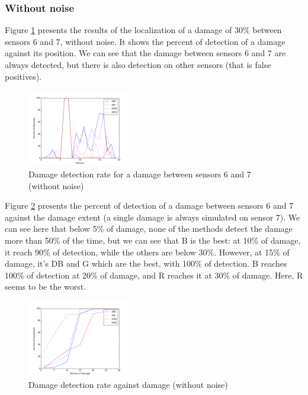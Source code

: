 \documentclass[journal]{IEEEtran}
\begin{document}
\subsubsection{Without noise}

Figure \ref{damage30} presents the results of the localization of a damage of 30\% between sensors 6 and 7, without noise.
It shows the percent of detection of a damage against its position.
We can see that the damage between sensors 6 and 7 are always detected, but there is also detection on other sensors (that is false positives).

\begin{figure}[h!]
  \centering
  \includegraphics[width=0.4\textwidth]{images/damage30percent.png}
  \caption{Damage detection rate for a damage between sensors 6 and 7 (without noise)}
  \label{damage30}
\end{figure}



Figure \ref{detect} presents the percent of detection of a damage between sensors 6 and 7 against the damage extent (a single damage is always simulated on sensor 7). We can see here that below 5\% of damage, none of the methods detect the damage more than 50\% of the time, but we can see that B is the best: at 10\% of damage, it reach 90\% of detection, while the others are below 30\%. However, at 15\% of damage, it's DB and G which are the best, with 100\% of detection. B reaches 100\% of detection at 20\% of damage, and R reaches it at 30\% of damage. Here, R seems to be the worst.

\begin{figure}[h!]
  \centering
  \includegraphics[width=0.4\textwidth]{images/detect.png}
  \caption{Damage detection rate against damage (without noise)}
  \label{detect}
\end{figure}
\end{document}
